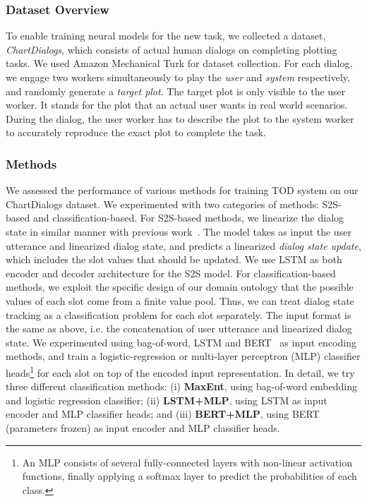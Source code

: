 \documentclass[11pt,dvipdfm]{article}
\begin{document}
\subsubsection{Dataset Overview}
To enable training neural models for the new task, we collected a dataset, \textit{ChartDialogs}, which consists of actual human dialogs on completing plotting tasks. 
We used Amazon Mechanical Turk for dataset collection. For each dialog, we engage two workers simultaneously to play the \textit{user} and \textit{system} respectively, and randomly generate a \textit{target plot}. The target plot is only visible to the user worker. It stands for the plot that an actual user wants in real world scenarios. During the dialog, the user worker has to describe the plot to the system worker to accurately reproduce the exact plot to complete the task.

\subsubsection{Methods}
We assessed the performance of various methods for training TOD system on our ChartDialogs dataset.
We experimented with two categories of methods: S2S-based and classification-based.
For S2S-based methods, we linearize the dialog state in similar manner with previous work~\cite{sequicity}. The model takes as input the user utterance and linearized dialog state, and predicts a linearized \textit{dialog state update}, which includes the slot values that should be updated. We use LSTM as both encoder and decoder architecture for the S2S model.
For classification-based methods, we exploit the specific design of our domain ontology that the possible values of each slot come from a finite value pool. Thus, we can treat dialog state tracking as a classification problem for each slot separately. The input format is the same as above, i.e. the concatenation of user utterance and linearized dialog state. We experimented using bag-of-word, LSTM and BERT~\cite{bert} as input encoding methods, and train a logistic-regression or multi-layer perceptron (MLP) classifier heads\footnote{An MLP consists of several fully-connected layers with non-linear activation functions, finally applying a softmax layer to predict the probabilities of each class.} for each slot on top of the encoded input representation.
In detail, we try three different classification methods: (i) \textbf{MaxEnt}, using bag-of-word embedding and logistic regression classifier; (ii) \textbf{LSTM+MLP}, using LSTM as input encoder and MLP classifier heads; and (iii) \textbf{BERT+MLP}, using BERT (parameters frozen) as input encoder and MLP classifier heads.
\end{document}
